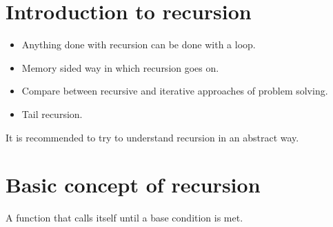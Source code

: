 \section{Introduction to recursion}
\begin{itemize}
    \item Anything done with recursion can be done with a loop.
    \item Memory sided way in which recursion goes on. 
    \item Compare between recursive and iterative approaches of problem solving. 
    \item Tail recursion. 
\end{itemize}
It is recommended to try to understand recursion in an abstract way.

\section{Basic concept of recursion}
A function that calls itself until a base condition is met.
